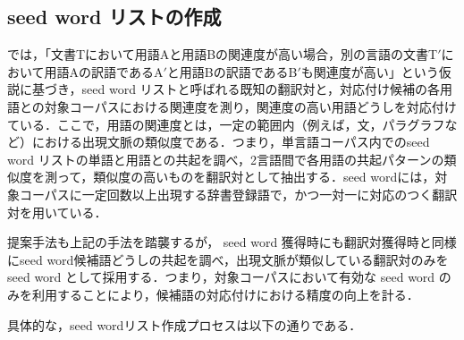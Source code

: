 \documentclass[japanese]{jnlp_1.3e}
\begin{document}
\begin{enumerate}
\end{enumerate}

\subsection{seed word リストの作成}\label{sec-SeedWord}

\cite{Fung_and_McKeown97}では，「文書Tにおいて用語Aと用語Bの関連度が高い場合，別の言語の文書T$'$において用語Aの訳語であるA$'$と用語Bの訳語であるB$'$も関連度が高い」という仮説に基づき，seed word リストと呼ばれる既知の翻訳対と，対応付け候補の各用語との対象コーパスにおける関連度を測り，関連度の高い用語どうしを対応付けている．ここで，用語の関連度とは，一定の範囲内（例えば，文，パラグラフなど）における出現文脈の類似度である．つまり，単言語コーパス内でのseed word リストの単語と用語との共起を調べ，2言語間で各用語の共起パターンの類似度を測って，類似度の高いものを翻訳対として抽出する．seed wordには，対象コーパスに一定回数以上出現する辞書登録語で，かつ一対一に対応のつく翻訳対を用いている．

提案手法も上記の手法を踏襲するが， seed word 獲得時にも翻訳対獲得時と同様にseed word候補語どうしの共起を調べ，出現文脈が類似している翻訳対のみを seed word として採用する．つまり，対象コーパスにおいて有効な seed word のみを利用することにより，候補語の対応付けにおける精度の向上を計る．

具体的な，seed wordリスト作成プロセスは以下の通りである．
\end{document}
